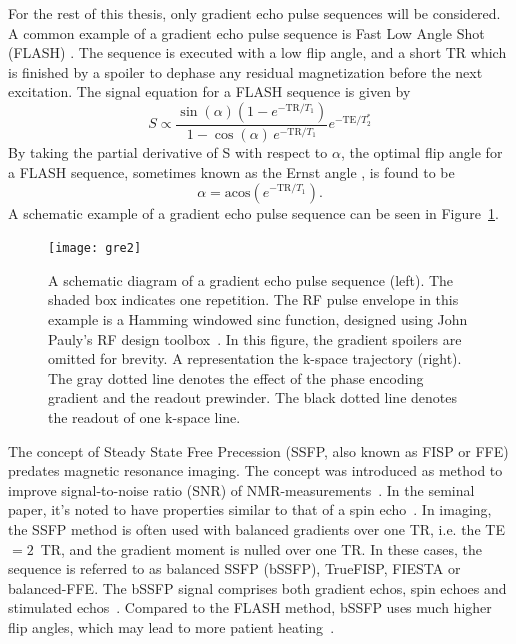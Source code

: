 For the rest of this thesis, only gradient echo pulse sequences will be considered. A common example of a gradient echo pulse sequence is Fast Low Angle Shot (FLASH) . The sequence is executed with a low flip angle, and a short TR which is finished by a spoiler to dephase any residual magnetization before the next excitation. The signal equation for a FLASH sequence is given by
\begin{equation}
    S \propto \frac{\sin(\alpha)(1-e^{-\textrm{TR}/T_1})}{1-\cos(\alpha)\,e^{-\textrm{TR}/T_1}}e^{-\textrm{TE}/T_2^*}
    \label{eq:flash}
\end{equation}
By taking the partial derivative of S with respect to $\alpha$, the optimal flip angle for a FLASH sequence, sometimes known as the Ernst angle \cite{Ernst1966}, is found to be
\begin{equation}
    \alpha = \textrm{acos}\left ( e^{-\textrm{TR}/T_1} \right ).
\end{equation}
A schematic example of a gradient echo pulse sequence can be seen in Figure~\ref{fig:gre}.
\begin{figure}[htbp]
    \centering
    \texttt{[image: gre2]}
    \caption{A schematic diagram of a gradient echo pulse sequence (left). The shaded box indicates one repetition. The RF pulse envelope in this example is a Hamming windowed sinc function, designed using John Pauly's RF design toolbox~\cite{Pauly1991}. In this figure, the gradient spoilers are omitted for brevity. A representation the k-space trajectory (right). The gray dotted line denotes the effect of the phase encoding gradient and the readout prewinder. The black dotted line denotes the readout of one k-space line.}
    \label{fig:gre}
\end{figure}
The concept of Steady State Free Precession (SSFP, also known as FISP or FFE)    predates magnetic resonance imaging. The concept was introduced as method to improve signal-to-noise ratio (SNR) of NMR-measurements~\cite{Carr1958}. In the seminal paper, it's noted to have properties similar to that of a spin echo~\cite{Hahn1950}. In imaging, the SSFP method is often used with balanced gradients over one TR, i.e. the TE $= 2\,$ TR, and the gradient moment is nulled over one TR. In these cases, the sequence is referred to as balanced SSFP (bSSFP), TrueFISP, FIESTA  or balanced-FFE.  The bSSFP signal comprises both gradient echos, spin echoes and stimulated echos~\cite{Scheffler2003a,Scheffler2003b}. Compared to the FLASH method, bSSFP uses much higher flip angles, which may lead to more patient heating~\cite{Srinivasan2015}.

